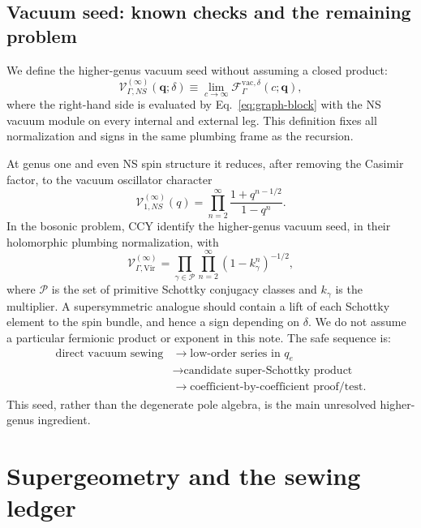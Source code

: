 \documentclass[11pt]{article}
\newcommand{\F}{\mathcal F}
\newcommand{\V}{\mathcal V}
\begin{document}
\subsection{Vacuum seed: known checks and the remaining problem}

We define the higher-genus vacuum seed without assuming a closed product:
\begin{equation}
 \V_{\Gamma,NS}^{(\infty)}(\boldsymbol q;\delta)
 \equiv
 \lim_{c\to\infty}
 \F_{\Gamma}^{\mathrm{vac},\delta}(c;\boldsymbol q),
 \label{eq:vacuum-definition}
\end{equation}
where the right-hand side is evaluated by Eq.~\eqref{eq:graph-block} with the
NS vacuum module on every internal and external leg.  This definition fixes
all normalization and signs in the same plumbing frame as the recursion.

At genus one and even NS spin structure it reduces, after removing the
Casimir factor, to the vacuum oscillator character
\begin{equation}
 \V_{1,NS}^{(\infty)}(q)
 =\prod_{n=2}^{\infty}\frac{1+q^{n-1/2}}{1-q^n}.
 \label{eq:torus-vacuum}
\end{equation}
In the bosonic problem, CCY identify the higher-genus vacuum seed, in their
holomorphic plumbing normalization, with
\begin{equation}
 \V_{\Gamma,\mathrm{Vir}}^{(\infty)}
 =\prod_{\gamma\in\mathcal P}\prod_{n=2}^{\infty}
 (1-k_\gamma^n)^{-1/2},
 \label{eq:ccy-schottky}
\end{equation}
where $\mathcal P$ is the set of primitive Schottky conjugacy classes and
$k_\gamma$ is the multiplier.  A supersymmetric analogue should contain a
lift of each Schottky element to the spin bundle, and hence a sign depending
on $\delta$.  We do not assume a particular fermionic product or exponent in
this note.  The safe sequence is:
\begin{equation}
 \begin{aligned}
 \text{direct vacuum sewing}
 &\longrightarrow \text{low-order series in $q_e$}\\
 &\longrightarrow \text{candidate super-Schottky product}\\
 &\longrightarrow \text{coefficient-by-coefficient proof/test}.
 \end{aligned}
 \label{eq:vacuum-sequence}
\end{equation}
This seed, rather than the degenerate pole algebra, is the main unresolved
higher-genus ingredient.

\section{Supergeometry and the sewing ledger}
\label{sec:supergeometry}
\end{document}
